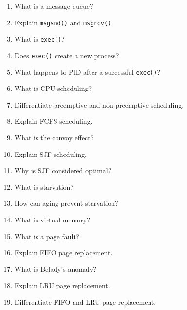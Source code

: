 \documentclass[12pt,a4paper]{report}
\begin{document}
\begin{enumerate}
    \item What is a message queue?

    \item Explain \texttt{msgsnd()} and \texttt{msgrcv()}.

    \item What is \texttt{exec()}?

    \item Does \texttt{exec()} create a new process?

    \item What happens to PID after a successful \texttt{exec()}?

    \item What is CPU scheduling?

    \item Differentiate preemptive and non-preemptive scheduling.

    \item Explain FCFS scheduling.

    \item What is the convoy effect?

    \item Explain SJF scheduling.

    \item Why is SJF considered optimal?

    \item What is starvation?

    \item How can aging prevent starvation?

    \item What is virtual memory?

    \item What is a page fault?

    \item Explain FIFO page replacement.

    \item What is Belady's anomaly?

    \item Explain LRU page replacement.

    \item Differentiate FIFO and LRU page replacement.

\end{enumerate}

\end{document}
